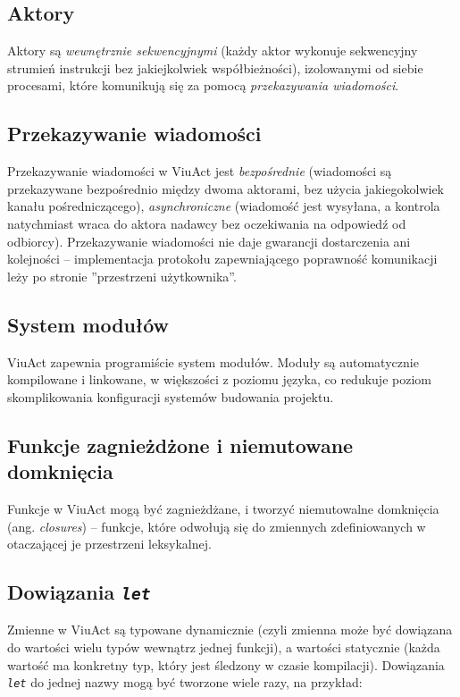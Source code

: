 \documentclass[11pt,oneside,a4paper,titlepage,onecolumn]{article}
\begin{document}
\subsection{Aktory}

Aktory są \emph{wewnętrznie sekwencyjnymi} (każdy aktor wykonuje sekwencyjny strumień instrukcji bez
jakiejkolwiek współbieżności), izolowanymi od siebie procesami, które komunikują się za pomocą
\emph{przekazywania wiadomości}.

\subsection{Przekazywanie wiadomości}

Przekazywanie wiadomości w ViuAct jest \emph{bezpośrednie} (wiadomości są przekazywane bezpośrednio między
dwoma aktorami, bez użycia jakiegokolwiek kanału pośredniczącego), \emph{asynchroniczne} (wiadomość jest
wysyłana, a kontrola natychmiast wraca do aktora nadawcy bez oczekiwania na odpowiedź od odbiorcy).
Przekazywanie wiadomości nie daje gwarancji dostarczenia ani kolejności -- implementacja protokołu
zapewniającego poprawność komunikacji leży po stronie ''przestrzeni użytkownika''.

\subsection{System modułów}

ViuAct zapewnia programiście system modułów. Moduły są automatycznie kompilowane i linkowane, w większości z
poziomu języka, co redukuje poziom skomplikowania konfiguracji systemów budowania projektu.

\subsection{Funkcje zagnieżdżone i niemutowane domknięcia}

Funkcje w ViuAct mogą być zagnieżdżane, i tworzyć niemutowalne domknięcia (ang. \emph{closures}) -- funkcje,
które odwołują się do zmiennych zdefiniowanych w otaczającej je przestrzeni leksykalnej.

\subsection{Dowiązania \emph{\texttt{let}}}

Zmienne w ViuAct są typowane dynamicznie (czyli zmienna może być dowiązana do wartości wielu typów wewnątrz
jednej funkcji), a wartości statycznie (każda wartość ma konkretny typ, który jest śledzony w czasie
kompilacji). Dowiązania \emph{\texttt{let}} do jednej nazwy mogą być tworzone wiele razy, na przykład:
\end{document}
